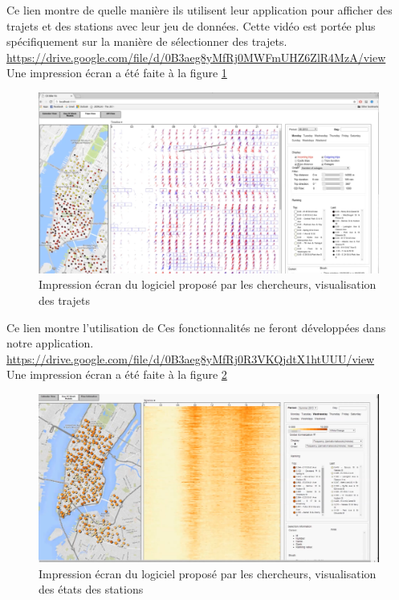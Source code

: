 \documentclass[12pt]{article}
\begin{document}
	Ce lien montre de quelle manière ils utilisent leur application pour afficher des trajets et
	des stations avec leur jeu de données. Cette vidéo est portée plus spécifiquement sur la manière
	de sélectionner des trajets.\\
	\url{https://drive.google.com/file/d/0B3aeg8yMfRj0MWFmUHZ6ZlR4MzA/view}\\
	Une impression écran a été faite à la figure \ref{fig:trips_screen}\\
	
	\begin{figure}[!h]
	\begin{center}
	\includegraphics[scale=.3]{existant_trips.png}
	\caption{Impression écran du logiciel proposé par les chercheurs, visualisation des trajets}
	\label{fig:trips_screen}
	\end{center}
	\end{figure}
	
	Ce lien montre l'utilisation de
	Ces fonctionnalités ne feront développées dans notre application.\\
	\url{https://drive.google.com/file/d/0B3aeg8yMfRj0R3VKQjdtX1htUUU/view}\\
	Une impression écran a été faite à la figure \ref{fig:station_screen}\\
	
	\begin{figure}[!h]
	\begin{center}
	\includegraphics[scale=.3]{existant_station_state.png}
	\caption{Impression écran du logiciel proposé par les chercheurs, visualisation des états
	des stations}
	\label{fig:station_screen}
	\end{center}
	\end{figure}
	
\end{document}
